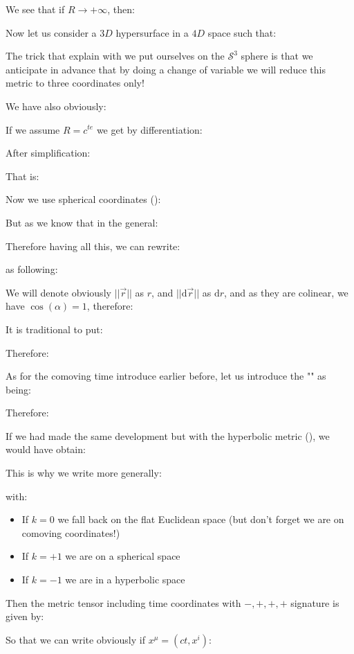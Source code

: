	We see that if $R\rightarrow +\infty$, then:
	
	Now let us consider a $3D$ hypersurface in a $4D$ space such that:
	
	The trick that explain with we put ourselves on the $\mathcal{S}^3$ sphere is that we anticipate in advance that by doing a change of variable we will reduce this metric to three coordinates only!
	
	We have also obviously:
	
	If we assume $R=c^{te}$ we get by differentiation:
	
	After simplification:
	
	That is:
	
	Now we use spherical coordinates ():
	
	But as we know that in the general:
	
	Therefore having all this, we can rewrite:
	
	as following:
	
	We will denote obviously $||\vec{r}||$ as $r$, and $||\mathrm{d}\vec{r}||$ as $\mathrm{d}r$, and as they are colinear, we have $\cos(\alpha)=1$, therefore:
	
	It is traditional to put:
	
	Therefore:
	
	As for the comoving time introduce earlier before, let us introduce the "" as being:
	
	Therefore:
	
	If we had made the same development but with the hyperbolic metric (), we would have obtain:
	
	This is why we write more generally:
	
	with:
	\begin{itemize}
		\item If $k=0$ we fall back on the flat Euclidean space (but don't forget we are on comoving coordinates!)
		
		\item If $k=+1$ we are on a spherical space
		
		\item If $k=-1$ we are in a hyperbolic space
	\end{itemize}
	Then the metric tensor including time coordinates with $-,+,+,+$ signature is given by:
	
	So that we can write obviously if $x^\mu=(ct,x^i)$:
	
